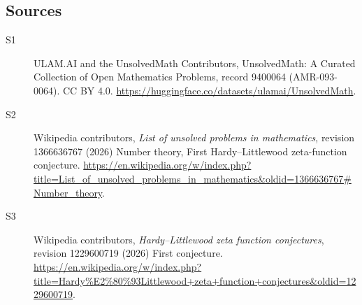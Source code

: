 \documentclass[11pt]{article}
\begin{document}
\subsection{Sources}
\begin{description}
\item[\hypertarget{source:9400064:1}{S1}] ULAM.AI and the UnsolvedMath Contributors, UnsolvedMath: A Curated Collection of Open Mathematics Problems, record 9400064 (AMR-093-0064). CC BY 4.0. \url{https://huggingface.co/datasets/ulamai/UnsolvedMath}.
\item[\hypertarget{source:9400064:2}{S2}] Wikipedia contributors, \emph{List of unsolved problems in mathematics}, revision 1366636767 (2026) Number theory, First Hardy–Littlewood zeta-function conjecture. \url{https://en.wikipedia.org/w/index.php?title=List_of_unsolved_problems_in_mathematics&oldid=1366636767#Number_theory}.
\item[\hypertarget{source:9400064:3}{S3}] Wikipedia contributors, \emph{Hardy–Littlewood zeta function conjectures}, revision 1229600719 (2026) First conjecture. \url{https://en.wikipedia.org/w/index.php?title=Hardy%E2%80%93Littlewood+zeta+function+conjectures&oldid=1229600719}.
\end{description}
\label{end:9400064}
\end{document}
